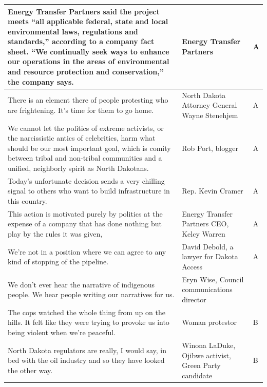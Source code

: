 \begin{footnotesize}
\begin{spacing}{1}
\begin{longtable}{| p{} | P{.25\textwidth} | p{.07\textwidth}|}
Energy Transfer Partners said the project meets ``all applicable federal, state and local environmental laws, regulations and standards,'' according to a company fact sheet. ``We continually seek ways to enhance our operations in the areas of environmental and resource protection and conservation,'' the company says.  & Energy Transfer Partners                     & A              \\ \hline
There is an element there of people protesting who are frightening. It's time for them to go home.                                                                    & North Dakota Attorney General Wayne Stenehjem                                                                  & A              \\ \hline
We cannot let the politics of extreme activists, or the narcissistic antics of celebrities, harm what should be our most important goal, which is comity between tribal and non-tribal communities and a unified, neighborly spirit as North Dakotans.    & Rob Port, blogger                            & A              \\ \hline
Today's unfortunate decision sends a very chilling signal to others who want to build infrastructure in this country.                                                 & Rep. Kevin Cramer                            & A              \\ \hline
This action is motivated purely by politics at the expense of a company that has done nothing but play by the rules it was given,                                     & Energy Transfer Partners CEO, Kelcy Warren   & A              \\ \hline
We're not in a position where we can agree to any kind of stopping of the pipeline.                 & David Debold, a lawyer for Dakota Access     & A              \\ \hline
We don't ever hear the narrative of indigenous people. We hear people writing our narratives for us. & Eryn Wise, Council communications director                                                         \\ \hline
The cops watched the whole thing from up on the hills. It felt like they were trying to provoke us into being violent when we're peaceful.                            & Woman protestor                              & B              \\ \hline
North Dakota regulators are really, I would say, in bed with the oil industry and so they have looked the other way.                                                  & Winona LaDuke, Ojibwe activist, Green Party candidate                                                          & B              \\ \hline

\end{longtable}
\end{spacing}
\end{footnotesize}
